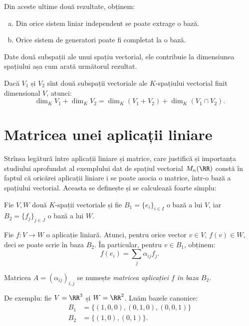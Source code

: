 Din aceste ultime două rezultate, obținem:
\begin{remark}
\begin{enumerate}[(a)]
\item Din orice sistem liniar independent se poate extrage o bază.
\item Orice sistem de generatori poate fi completat la o bază.
\end{enumerate}
\end{remark}

Date două subspații ale unui spațiu vectorial, ele contribuie la dimensiunea 
spațiului așa cum arată următorul rezultat.
\begin{theorem} 
Dacă $V_1$ și $V_2$ sînt două subspații vectoriale ale $K$-spațiului 
vectorial finit dimensional $V$, atunci: 
\[
\dim_K V_1 + \dim_K V_2=\dim_K(V_1 + V_2) + \dim_K(V_1\cap V_2).
\]
\end{theorem}


\section{Matricea unei aplicații liniare}
\label{sec:matrice-apl-lin}

Strînsa legătură între aplicații liniare și matrice, care justifică și importanța
studiului aprofundat al exemplului dat de spațiul vectorial $M_n(\RR)$ constă
în faptul că oricărei aplicații liniare i se poate asocia o matrice, într-o bază
a spațiului vectorial. Aceasta se definește și se calculează foarte simplu:

\begin{definition}\label{def:matrice-apl-lin} 
  Fie $V, W$ două $K$-spații vectoriale și fie $B_1 = \{ e_i \}_{i \in I}$
  o bază a lui $V$, iar $B_2 = \{ f_j \}_{j \in J}$ o bază a lui $W$.

  Fie $f : V \to W$ o aplicație liniară. Atunci, pentru orice vector $v \in V$,
  $f(v) \in W$, deci se poate scrie în baza $B_2$. În particular, pentru $v \in B_1$,
  obținem:
  \[
    f(e_i) = \sum_j \alpha_{ij} f_j.
  \]

  Matricea $A = (\alpha_{ij})_{i,j}$ se numește \emph{matricea aplicației $f$ în baza $B_2$}.
\end{definition}

De exemplu: fie $V = \RR^3$ și $W = \RR^2$. Luăm bazele canonice:
\begin{align*}
  B_1 &= \{ (1, 0, 0), (0, 1, 0), (0, 0, 1) \} \\
  B_2 &= \{ (1, 0), (0, 1) \}.
\end{align*}

